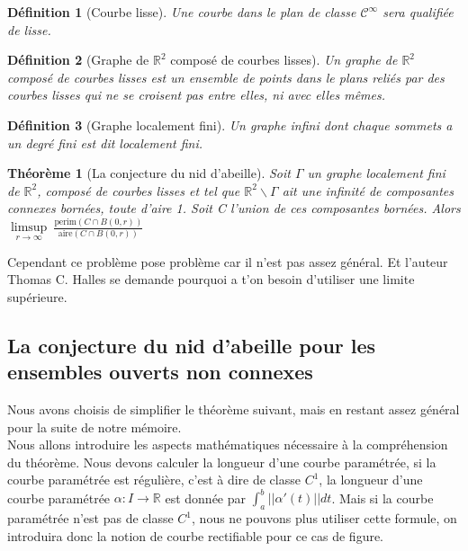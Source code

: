 \documentclass{book}
\newtheorem{theorem}{Théorème}
\newtheorem{definition}{Définition}
\begin{document}
\begin{definition}[Courbe lisse]
Une courbe dans le plan de classe $\mathcal{C}^{\infty}$ sera qualifiée de lisse.
\end{definition}

\begin{definition}[Graphe de $\mathbb{R}^2$ composé de courbes lisses]
Un graphe de $\mathbb{R}^2$ composé de courbes lisses est un ensemble de points dans le plans reliés par des courbes lisses qui ne se croisent pas entre elles, ni avec elles mêmes.
\end{definition}

\begin{definition}[Graphe localement fini]
Un graphe infini dont chaque sommets a un degré fini est dit localement fini.
\end{definition}

\begin{tcolorbox}[colback=green!6]
\begin{theorem}[La conjecture du nid d'abeille]
Soit $\Gamma$ un graphe localement fini de $\mathbb{R}^2$, composé de courbes lisses et tel que $\mathbb{R}^2 \backslash \Gamma$ ait une infinité de composantes connexes bornées, toute d'aire 1.
Soit C l'union de ces composantes bornées.
Alors $\underset{r \rightarrow \infty}{\limsup}~ \frac{\text{perim}(C \cap B(0,r))}{\text{aire}(C \cap B(0,r))}$
\end{theorem}
\end{tcolorbox}

Cependant ce problème pose problème car il n'est pas assez général. Et l'auteur Thomas C. Halles se demande pourquoi a t'on besoin d'utiliser une limite supérieure.
\subsection{La conjecture du nid d'abeille pour les ensembles ouverts non connexes}

Nous avons choisis de simplifier le théorème suivant, mais en restant assez général pour la suite de notre mémoire. \\
Nous allons introduire les aspects mathématiques nécessaire à la compréhension du théorème.
Nous devons calculer la longueur d'une courbe paramétrée, si la courbe paramétrée est régulière, c'est à dire de classe $C^1$, la longueur d'une courbe paramétrée $\alpha : I \rightarrow \mathbb{R}$ est donnée par $\int^b_a ||\alpha ' (t) || dt$. Mais si la courbe paramétrée n'est pas de classe $C^1$, nous ne pouvons plus utiliser cette formule, on introduira donc la notion de courbe rectifiable pour ce cas de figure.
\end{document}
